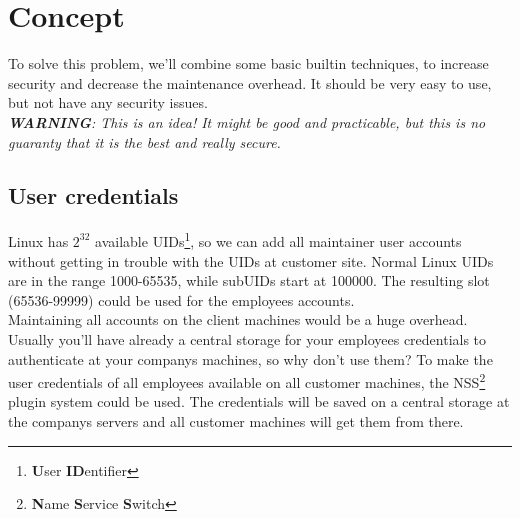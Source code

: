 %
%
%
%
%
%
%


\section{Concept}

To solve this problem, we'll combine some basic builtin techniques, to
increase security and decrease the maintenance overhead. It should be very easy
to use, but not have any security issues. \\

\textit{\textbf{WARNING}: This is an idea! It might be good and practicable, but
this is no guaranty that it is the best and really secure.}


\subsection{User credentials}

Linux has $2^{32}$ available UIDs\footnote{\textbf{U}ser \textbf{ID}entifier},
so we can add all maintainer user accounts without getting in trouble with the
UIDs at customer site. Normal Linux UIDs are in the range 1000-65535, while
subUIDs start at 100000. The resulting slot (65536-99999) could be used for
the employees accounts. \\

Maintaining all accounts on the client machines would be a huge overhead.
Usually you'll have already a central storage for your employees credentials to
authenticate at your companys machines, so why don't use them? To make the user
credentials of all employees available on all customer machines, the
NSS\footnote{\textbf{N}ame \textbf{S}ervice \textbf{S}witch} plugin system could
be used. The credentials will be saved on a central storage at the companys
servers and all customer machines will get them from there. \\


